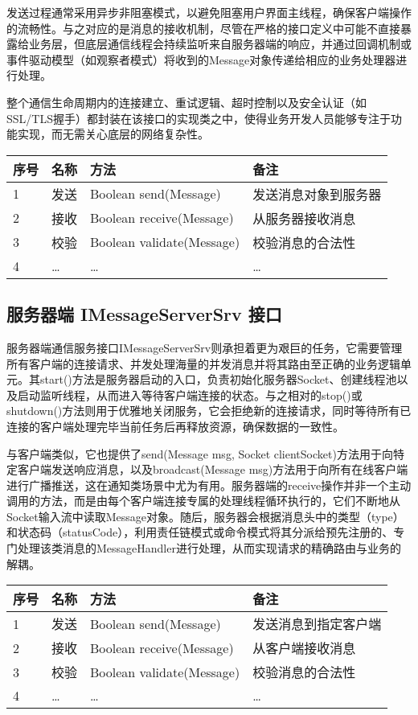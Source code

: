\documentclass[a4paper]{ctexart}
\begin{document}
发送过程通常采用异步非阻塞模式，以避免阻塞用户界面主线程，确保客户端操作的流畅性。与之对应的是消息的接收机制，尽管在严格的接口定义中可能不直接暴露给业务层，但底层通信线程会持续监听来自服务器端的响应，并通过回调机制或事件驱动模型（如观察者模式）将收到的Message对象传递给相应的业务处理器进行处理。

整个通信生命周期内的连接建立、重试逻辑、超时控制以及安全认证（如SSL/TLS握手）都封装在该接口的实现类之中，使得业务开发人员能够专注于功能实现，而无需关心底层的网络复杂性。
\begin{tabular}{llll}
    \toprule
    \textbf{序号} & \textbf{名称} & \textbf{方法}               & \textbf{备注} \\
    \midrule
    1           & 发送          & Boolean send(Message)     & 发送消息对象到服务器  \\
    2           & 接收          & Boolean receive(Message)  & 从服务器接收消息    \\
    3           & 校验          & Boolean validate(Message) & 校验消息的合法性    \\
    4           & …           & …                         & …           \\
    \bottomrule
\end{tabular}

\subsection{服务器端 IMessageServerSrv 接口}
服务器端通信服务接口IMessageServerSrv则承担着更为艰巨的任务，它需要管理所有客户端的连接请求、并发处理海量的并发消息并将其路由至正确的业务逻辑单元。其start()方法是服务器启动的入口，负责初始化服务器Socket、创建线程池以及启动监听线程，从而进入等待客户端连接的状态。与之相对的stop()或shutdown()方法则用于优雅地关闭服务，它会拒绝新的连接请求，同时等待所有已连接的客户端处理完毕当前任务后再释放资源，确保数据的一致性。

与客户端类似，它也提供了send(Message msg, Socket clientSocket)方法用于向特定客户端发送响应消息，以及broadcast(Message msg)方法用于向所有在线客户端进行广播推送，这在通知类场景中尤为有用。服务器端的receive操作并非一个主动调用的方法，而是由每个客户端连接专属的处理线程循环执行的，它们不断地从Socket输入流中读取Message对象。随后，服务器会根据消息头中的类型（type）和状态码（statusCode），利用责任链模式或命令模式将其分派给预先注册的、专门处理该类消息的MessageHandler进行处理，从而实现请求的精确路由与业务的解耦。
\begin{tabular}{llll}
    \toprule
    \textbf{序号} & \textbf{名称} & \textbf{方法}               & \textbf{备注} \\
    \midrule
    1           & 发送          & Boolean send(Message)     & 发送消息到指定客户端  \\
    2           & 接收          & Boolean receive(Message)  & 从客户端接收消息    \\
    3           & 校验          & Boolean validate(Message) & 校验消息的合法性    \\
    4           & …           & …                         & …           \\
    \bottomrule
\end{tabular}
\end{document}
